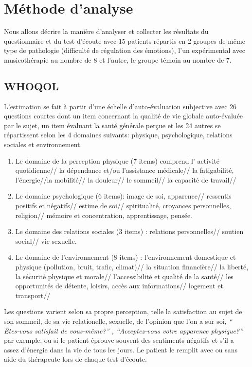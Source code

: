 \section{Méthode d'analyse}
Nous allons décrire la manière d'analyser et collecter les résultats du questionnaire et du test d'écoute 
avec 15 patients répartis en 2 groupes de même type de pathologie (difficulté de régulation des 
émotions), l'un expérimental avec musicothérapie au nombre de 8 et l'autre, le groupe témoin au nombre 
de 7. 
\subsection{WHOQOL}
L'estimation se fait à partir d'une échelle
d'auto-évaluation subjective avec 26 questions courtes
dont un item concernant la qualité de vie globale
auto-évaluée par le sujet, un item évaluant la santé générale perçue
et les 24 autres se répartissent selon les 4 domaines suivants: physique, psychologique, relations 
sociales et environnement.
\begin{enumerate}
	\item  Le domaine de la perception physique (7 items) comprend l' activité quotidienne// la dépendance 
	et/ou l'assistance médicale// la fatigabilité, l'énergie//la mobilité// la douleur// le sommeil// la capacité 
	de travail//
	\item Le domaine psychologique (6 items):  image de soi, apparence// ressentis positifs et négatifs// 
	estime de soi// spiritualité, croyances personnelles, religion// mémoire et concentration, apprentissage, 
	pensée.
	\item Le domaine des relations sociales (3 items) : relations personnelles// soutien social// vie sexuelle.
	\item Le domaine de l'environnement (8 items) :
	l'environnement domestique et physique
	(pollution, bruit, trafic, climat)// la
	situation financière//  la liberté, la
	sécurité physique et morale//
	l'accessibilité et qualité de la santé// les
	opportunités de détente, loisirs, accès aux
	informations// logement et transport//
\end{enumerate}
Les questions varient selon sa propre perception, telle la satisfaction
au sujet de son  sommeil, de sa vie relationelle, sexuelle, de
l'opinion que l'on a sur soi, \textit{`` Êtes-vous satisfait de
	vous-même?'' , ``Acceptez-vous votre apparence physique?''} par
exemple, ou si le patient éprouve souvent des sentiments négatifs
et s'il a assez d'énergie dans la vie de tous les jours.
Le patient le remplit avec ou sans aide du
thérapeute lors de chaque test
d'écoute.

